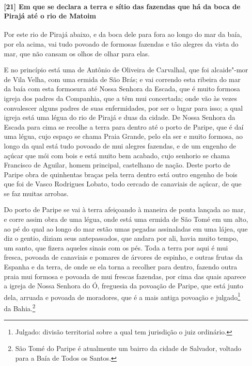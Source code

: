 \paragraph{[21] Em que se declara a terra e sítio das fazendas que há da boca de Pirajá até
o rio de Matoim}\quad
Por este rio de Pirajá abaixo, e da boca dele para fora ao longo do mar da baía, por ela
acima, vai tudo povoado de formosas fazendas e tão alegres da vista do mar, que não cansam
os olhos de olhar para elas.

E no princípio está uma de Antônio de Oliveira de Carvalhal, que foi alcaide"-mor de Vila
Velha, com uma ermida de São Brás; e vai correndo esta ribeira do mar da baía com esta
formosura até Nossa \EP[1] Senhora da Escada, que é muito formosa igreja dos padres da
Companhia, que a têm mui concertada; onde vão às vezes convalescer alguns padres de suas
enfermidades, por ser o lugar para isso; a qual igreja está uma légua do rio de Pirajá e
duas da cidade. De Nossa Senhora da Escada para cima se recolhe a terra para dentro até o
porto de Paripe, que é daí uma légua, cujo espaço se chama Praia Grande, pelo ela ser e
muito formosa, ao longo da qual está tudo povoado de mui alegres fazendas, e de um engenho
de açúcar que mói com bois e está muito bem acabado, cujo senhorio se chama Francisco de
Aguilar, homem principal, castelhano de nação. Deste porto de Paripe obra de quinhentas
braças pela terra dentro está outro engenho de bois que foi de Vasco Rodrigues Lobato,
todo cercado de canaviais de açúcar, de que se faz muitas arrobas.

Do porto de Paripe se vai à terra afeiçoando à maneira de ponta lançada ao mar, e corre
assim obra de uma légua, onde está uma ermida de São Tomé em um alto, ao pé do qual ao
longo do mar estão umas pegadas assinaladas em uma lájea, que diz o gentio, diziam seus
antepassados, que andara por ali, havia muito tempo, um santo, que fizera aqueles sinais
com os pés. Toda a terra por aqui é mui fresca, povoada de canaviais e pomares de árvores
de espinho, e outras frutas da Espanha e da terra, de onde se ela torna a recolher para
dentro, fazendo outra praia mui formosa e povoada de mui frescas fazendas, por cima das
quais aparece a igreja de Nossa Senhora do Ó, freguesia da povoação de Paripe, que está
junto dela, arruada e povoada de moradores, que é a mais antiga povoação e
julgado\footnote{ Julgado: divisão territorial sobre a qual tem jurisdição o juiz
ordinário.} da Bahia.\footnote{ São Tomé do Paripe é atualmente um bairro da cidade de
Salvador, voltado para a Baía de Todos os Santos.}

